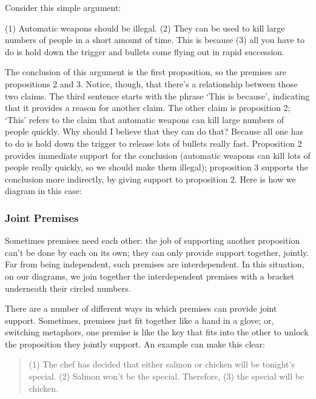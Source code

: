 Consider this simple argument:

(1) Automatic weapons should be illegal. (2) They can be used to kill large numbers of
people in a short amount of time. This is because (3) all you have to do is hold down the
trigger and bullets come flying out in rapid succession.

The conclusion of this argument is the first proposition, so the premises are propositions 2 and 3.
Notice, though, that there's a relationship between those two claims. The third sentence starts with
the phrase `This is because', indicating that it provides a reason for another claim. The other claim
is proposition 2; `This' refers to the claim that automatic weapons can kill large numbers of people
quickly. Why should I believe that they can do that? Because all one has to do is hold down the
trigger to release lots of bullets really fast. Proposition 2 provides immediate support for the
conclusion (automatic weapons can kill lots of people really quickly, so we should make them
illegal); proposition 3 supports the conclusion more indirectly, by giving support to proposition 2.
Here is how we diagram in this case:



\subsubsection{Joint Premises}
Sometimes premises need each other: the job of supporting another proposition can't be done by
each on its own; they can only provide support together, jointly. Far from being independent, such
premises are interdependent. In this situation, on our diagrams, we join together the interdependent
premises with a bracket underneath their circled numbers.

There are a number of different ways in which premises can provide joint support. Sometimes,
premises just fit together like a hand in a glove; or, switching metaphors, one premise is like the
key that fits into the other to unlock the proposition they jointly support. An example can make
this clear:

\begin{quotation}
(1) The chef has decided that either salmon or chicken will be tonight's special. (2) Salmon
won't be the special. Therefore, (3) the special will be chicken.
\end{quotation}

